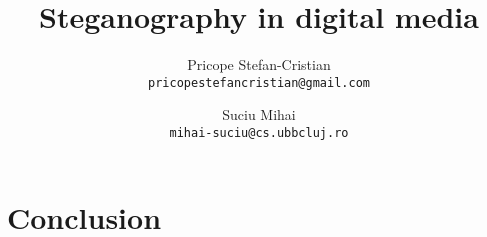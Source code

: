 \documentclass{article}
\begin{document}
\title{Steganography in digital media}

\author{
	Pricope Stefan-Cristian\\
	\texttt{pricopestefancristian@gmail.com}
  	\and
  	Suciu Mihai\\
  	\texttt{mihai-suciu@cs.ubbcluj.ro}
}
\date{\vspace{-5ex}}
\maketitle









\section{Conclusion}

\end{document}
